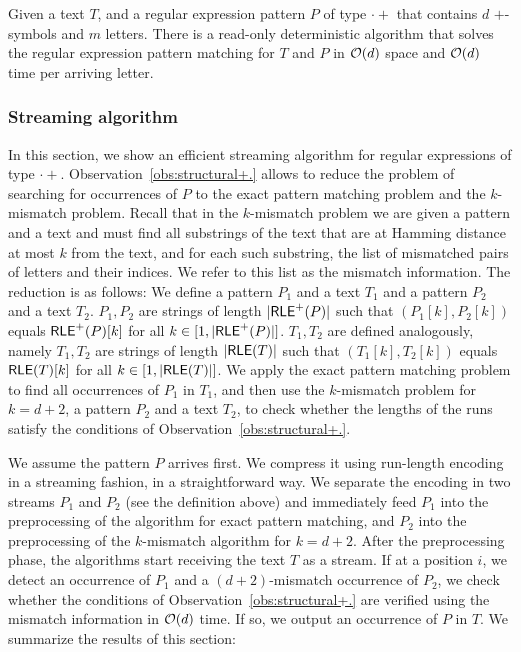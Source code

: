 \documentclass{article}
\begin{document}
\begin{corollary}
Given a text $T$, and a regular expression pattern $P$ of type $\cdot+$ that contains $d$ $+$-symbols and $m$ letters. There is a read-only deterministic algorithm that solves the regular expression pattern matching for $T$ and $P$ in $\mathcal{O}(d)$ space and $\mathcal{O}(d)$ time per arriving letter. 
\end{corollary}

\subsubsection{Streaming algorithm}
In this section, we show an efficient streaming algorithm for regular expressions of type $\cdot+$. Observation~\ref{obs:structural+.} allows to reduce the problem of searching for occurrences of $P$ to the exact pattern matching problem and the $k$-mismatch problem. Recall that in the $k$-mismatch problem we are given a pattern and a text and must find all substrings of the text that are at Hamming distance at most $k$ from the text, and for each such substring, the list of mismatched pairs of letters and their indices. We refer to this list as the mismatch information. The reduction is as follows:
We define a pattern $P_1$ and a text $T_1$ and a pattern $P_2$ and a text $T_2$. $P_1,P_2$ are strings of length $|\textsf{RLE}^+(P)|$ such that $(P_1[k],P_2[k])$ equals $\textsf{RLE}^+(P)[k]$ for all $k \in [1,|\textsf{RLE}^+(P)|]$. $T_1,T_2$ are defined analogously, namely $T_1,T_2$ are strings of length $|\textsf{RLE}(T)|$ such that $(T_1[k],T_2[k])$ equals $\textsf{RLE}(T)[k]$ for all $k \in [1,|\textsf{RLE}(T)|]$.
We apply the exact pattern matching problem to find all occurrences of $P_1$ in $T_1$, and then use the $k$-mismatch problem for $k=d+2$, a pattern $P_2$ and a text $T_2$, to check whether the lengths of the runs satisfy the conditions of Observation~\ref{obs:structural+.}.


We assume the pattern $P$ arrives first. We compress it using run-length encoding in a streaming fashion, in a straightforward way. We separate the encoding in two streams $P_1$ and $P_2$ (see the definition above) and immediately feed $P_1$ into the preprocessing of the algorithm for exact pattern matching, and $P_2$ into the preprocessing of the $k$-mismatch algorithm for $k=d+2$.
After the preprocessing phase, the algorithms start receiving the text $T$ as a stream.
If at a position $i$, we detect an occurrence of $P_1$ and a $(d+2)$-mismatch occurrence of $P_2$, we check whether the conditions of Observation~\ref{obs:structural+.} are verified using the mismatch information in $\mathcal{O}(d)$ time. If so, we output an occurrence of $P$ in $T$.
We summarize the results of this section:
\end{document}
